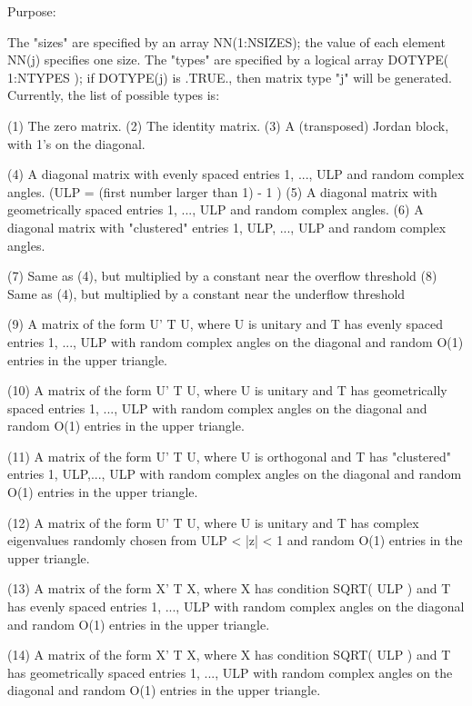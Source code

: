 \begin{DoxyParagraph}{Purpose\+: }
\begin{DoxyVerb}
    The "sizes" are specified by an array NN(1:NSIZES); the value of
    each element NN(j) specifies one size.
    The "types" are specified by a logical array DOTYPE( 1:NTYPES );
    if DOTYPE(j) is .TRUE., then matrix type "j" will be generated.
    Currently, the list of possible types is:

    (1)  The zero matrix.
    (2)  The identity matrix.
    (3)  A (transposed) Jordan block, with 1's on the diagonal.

    (4)  A diagonal matrix with evenly spaced entries
         1, ..., ULP  and random complex angles.
         (ULP = (first number larger than 1) - 1 )
    (5)  A diagonal matrix with geometrically spaced entries
         1, ..., ULP  and random complex angles.
    (6)  A diagonal matrix with "clustered" entries 1, ULP, ..., ULP
         and random complex angles.

    (7)  Same as (4), but multiplied by a constant near
         the overflow threshold
    (8)  Same as (4), but multiplied by a constant near
         the underflow threshold

    (9)  A matrix of the form  U' T U, where U is unitary and
         T has evenly spaced entries 1, ..., ULP with random
         complex angles on the diagonal and random O(1) entries in
         the upper triangle.

    (10) A matrix of the form  U' T U, where U is unitary and
         T has geometrically spaced entries 1, ..., ULP with random
         complex angles on the diagonal and random O(1) entries in
         the upper triangle.

    (11) A matrix of the form  U' T U, where U is orthogonal and
         T has "clustered" entries 1, ULP,..., ULP with random
         complex angles on the diagonal and random O(1) entries in
         the upper triangle.

    (12) A matrix of the form  U' T U, where U is unitary and
         T has complex eigenvalues randomly chosen from
         ULP < |z| < 1   and random O(1) entries in the upper
         triangle.

    (13) A matrix of the form  X' T X, where X has condition
         SQRT( ULP ) and T has evenly spaced entries 1, ..., ULP
         with random complex angles on the diagonal and random O(1)
         entries in the upper triangle.

    (14) A matrix of the form  X' T X, where X has condition
         SQRT( ULP ) and T has geometrically spaced entries
         1, ..., ULP with random complex angles on the diagonal
         and random O(1) entries in the upper triangle.


\end{DoxyVerb}
\end{DoxyParagraph}
